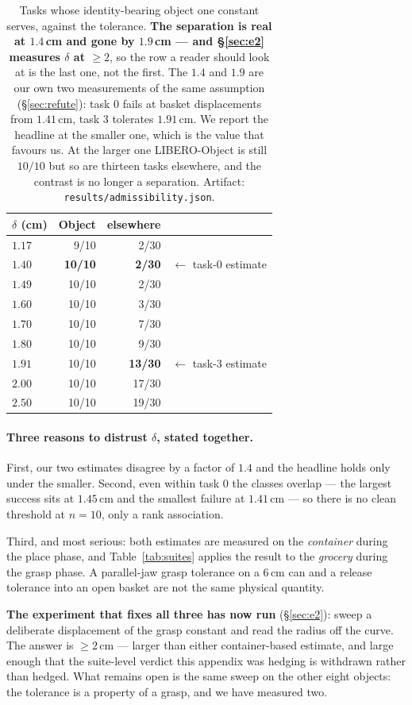 \documentclass[10pt,twocolumn]{article}
\begin{document}
\begin{table}[h]\centering\footnotesize
\setlength{\tabcolsep}{4pt}
\begin{tabular}{lrrl}
\toprule
$\delta$ (cm) & Object & elsewhere & \\
\midrule
$1.17$ & 9/10 & 2/30 & \\
$1.40$ & \textbf{10/10} & \textbf{2/30} & $\leftarrow$ task-0 estimate \\
$1.49$ & 10/10 & 2/30 & \\
$1.60$ & 10/10 & 3/30 & \\
$1.70$ & 10/10 & 7/30 & \\
$1.80$ & 10/10 & 9/30 & \\
$1.91$ & 10/10 & \textbf{13/30} & $\leftarrow$ task-3 estimate \\
$2.00$ & 10/10 & 17/30 & \\
$2.50$ & 10/10 & 19/30 & \\
\bottomrule
\end{tabular}
\caption{Tasks whose identity-bearing object one constant serves, against the
tolerance. \textbf{The separation is real at $1.4$\,cm and gone by
$1.9$\,cm --- and \S\ref{sec:e2} measures $\delta$ at $\geq 2$}, so the row a
reader should look at is the last one, not the first. The $1.4$ and $1.9$ are
our own two measurements of the same
assumption (\S\ref{sec:refute}): task $0$ fails at basket displacements from
$1.41$\,cm, task $3$ tolerates $1.91$\,cm. We report the headline at the
smaller one, which is the value that favours us. At the larger one
LIBERO-Object is still $10/10$ but so are thirteen tasks elsewhere, and the
contrast is no longer a separation. Artifact:
\texttt{results/admissibility.json}.}
\label{tab:deltasens}
\end{table}

\paragraph{Three reasons to distrust $\delta$, stated together.} First, our two
estimates disagree by a factor of $1.4$ and the headline holds only under the
smaller. Second, even within task $0$ the classes overlap --- the largest
success sits at $1.45$\,cm and the smallest failure at $1.41$\,cm --- so there
is no clean threshold at $n{=}10$, only a rank association.

Third, and most serious: both estimates are measured on the \emph{container}
during the place phase, and Table~\ref{tab:suites} applies the result to the
\emph{grocery} during the grasp phase. A parallel-jaw grasp tolerance on a
$6$\,cm can and a release tolerance into an open basket are not the same
physical quantity.

\textbf{The experiment that fixes all three has now run}
(\S\ref{sec:e2}): sweep a deliberate displacement of the grasp constant and
read the radius off the curve. The answer is $\geq 2$\,cm --- larger than
either container-based estimate, and large enough that the suite-level verdict
this appendix was hedging is withdrawn rather than hedged. What remains open
is the same sweep on the other eight objects: the tolerance is a property of a
grasp, and we have measured two.



\end{document}
